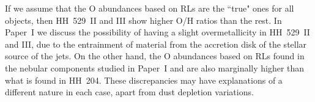 \documentclass[twocolumn,linenumbers]{aastex63}
\begin{document}


If we assume that the O abundances based on RLs are the ``true" ones for all objects, then HH~529~II and III 
show higher O/H ratios than the rest. 
In Paper~I we discuss the possibility of having a slight overmetallicity in HH~529~II and III, due to the entrainment of material from the accretion disk of the stellar source of the jets. On the other hand, the O abundances based on RLs found in the nebular components studied in Paper~I and \citet[][]{Esteban04} are also marginally higher than what is found in HH~204. These discrepancies may have  explanations of a different nature in each case, apart from dust depletion variations.
\end{document}
